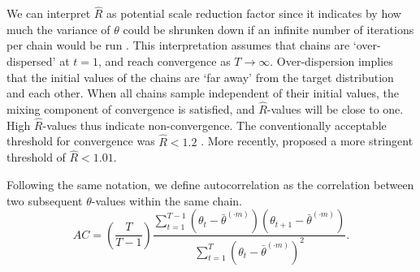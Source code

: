 \documentclass[article]{jss}
\begin{document}
We can interpret $\widehat{R}$ as potential scale reduction factor since it indicates by how much the variance of $\theta$ could be shrunken down if an infinite number of iterations per chain would be run \citep{gelm92}. This interpretation assumes that chains are `over-dispersed' at $t=1$, and reach convergence as $T \to \infty$. Over-dispersion implies that the initial values of the chains are `far away' from the target distribution and each other. When all chains sample independent of their initial values, the mixing component of convergence is satisfied, and $\widehat{R}$-values will be close to one. High $\widehat{R}$-values thus indicate non-convergence. %
The conventionally acceptable threshold for convergence was $\widehat{R} < 1.2$ \citep{gelm92}. More recently, \cite{veht19} proposed a more stringent threshold of $\widehat{R} < 1.01$. 

Following the same notation, we define autocorrelation as the correlation between two subsequent $\theta$-values within the same chain\footnotemark  \citep[p.~147]{lync07}. %
%
\begin{equation*}
AC = \left( \frac{T}{T-1} \right) \frac{\sum_{t=1}^{T-1}(\theta_t - \bar{\theta}^{(\cdot m)})(\theta_{t+1} - \bar{\theta}^{(\cdot m)})}{\sum_{t=1}^{T}(\theta_t - \bar{\theta}^{(\cdot m)})^2}.
\end{equation*}
%
\end{document}
